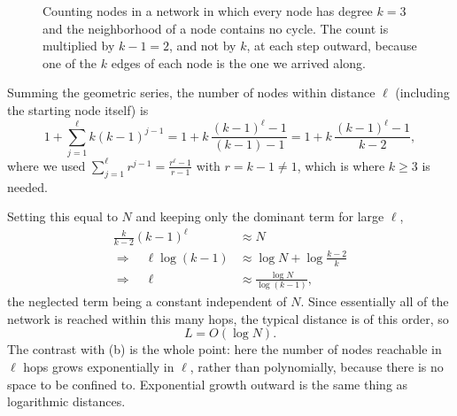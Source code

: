 \documentclass[a4paper,12pt]{article}
\begin{document}
\begin{enumerate}[label=(\alph*)]
\begin{figure}[h]
\begin{center}
\caption{Counting nodes in a network in which every node has degree $k=3$ and the neighborhood of a node contains no cycle. The count is multiplied by $k-1=2$, and not by $k$, at each step outward, because one of the $k$ edges of each node is the one we arrived along.}
\label{fig:hw4tree}
\end{center}
\end{figure}
Summing the geometric series, the number of nodes within distance $\ell$ (including the starting node itself) is
\[ 1+\sum_{j=1}^{\ell} k(k-1)^{j-1}
= 1 + k\,\frac{(k-1)^{\ell}-1}{(k-1)-1}
= 1+k\,\frac{(k-1)^{\ell}-1}{k-2} , \]
where we used $\sum_{j=1}^{\ell} r^{j-1} = \frac{r^{\ell}-1}{r-1}$ with $r=k-1 \neq 1$, which is where $k \geq 3$ is needed.

Setting this equal to $N$ and keeping only the dominant term for large $\ell$,
\[ \begin{aligned}
\frac{k}{k-2}(k-1)^{\ell} &\approx N\\
\Longrightarrow\quad \ell \log(k-1) &\approx \log N + \log\frac{k-2}{k}\\
\Longrightarrow\quad \ell &\approx \frac{\log N}{\log (k-1)} ,
\end{aligned} \]
the neglected term being a constant independent of $N$. Since essentially all of the network is reached within this many hops, the typical distance is of this order, so
\[ L = O\!\left( \log N \right) . \]
The contrast with (b) is the whole point: here the number of nodes reachable in $\ell$ hops grows exponentially in $\ell$, rather than polynomially, because there is no space to be confined to. Exponential growth outward is the same thing as logarithmic distances.


\end{enumerate}
\end{document}
